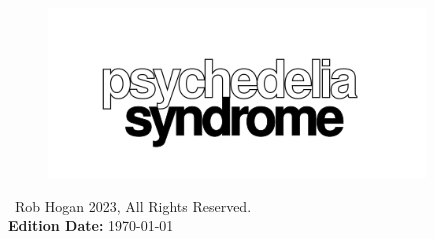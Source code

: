 
\vspace*{\fill}
\begin{figure}[H]
    \centering
      \includegraphics[width=10cm]{src/cover/title_page.png}%
\end{figure}
\vspace*{\fill}
\thispagestyle{empty}%

\clearpage

\vspace*{\fill}
\textcopyright\ Rob Hogan 2023, All Rights Reserved. \\
\textbf{Edition Date:} \today

\doclicenseThis
\thispagestyle{empty}%
\clearpage
